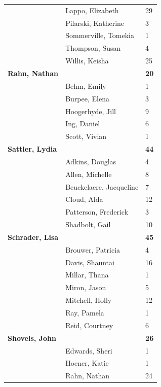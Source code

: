 \documentclass{article}\usepackage[]{graphicx}\usepackage[]{color}
\begin{document}
{\begin{longtable} { >{\raggedright}p{}|p{}p{}}
   & Lappo, Elizabeth & 29 \\ 
   & Pilarski, Katherine & 3 \\ 
   & Sommerville, Tomekia & 1 \\ 
   \rowcolor[gray]{0.90} & Thompson, Susan & 4 \\ 
   \rowcolor[gray]{0.90} & Willis, Keisha & 25 \\ 
   \rowcolor[gray]{0.90}\textbf{Rahn, Nathan} &  & \hspace{2cm}\textbf{20} \\ 
   & Behm, Emily & 1 \\ 
   & Burpee, Elena & 3 \\ 
   & Hoogerhyde, Jill & 9 \\ 
   \rowcolor[gray]{0.90} & Ing, Daniel & 6 \\ 
   \rowcolor[gray]{0.90} & Scott, Vivian & 1 \\ 
   \rowcolor[gray]{0.90}\textbf{Sattler, Lydia} &  & \hspace{2cm}\textbf{44} \\ 
   & Adkins, Douglas & 4 \\ 
   & Allen, Michelle & 8 \\ 
   & Beuckelaere, Jacqueline & 7 \\ 
   \rowcolor[gray]{0.90} & Cloud, Alda & 12 \\ 
   \rowcolor[gray]{0.90} & Patterson, Frederick & 3 \\ 
   \rowcolor[gray]{0.90} & Shadbolt, Gail & 10 \\ 
  \textbf{Schrader, Lisa} &  & \hspace{2cm}\textbf{45} \\ 
   & Brouwer, Patricia & 4 \\ 
   & Davis, Shauntai & 16 \\ 
   \rowcolor[gray]{0.90} & Millar, Thana & 1 \\ 
   \rowcolor[gray]{0.90} & Miron, Jason & 5 \\ 
   \rowcolor[gray]{0.90} & Mitchell, Holly & 12 \\ 
   & Ray, Pamela & 1 \\ 
   & Reid, Courtney & 6 \\ 
  \textbf{Shovels, John} &  & \hspace{2cm}\textbf{26} \\ 
   \rowcolor[gray]{0.90} & Edwards, Sheri & 1 \\ 
   \rowcolor[gray]{0.90} & Hoener, Katie & 1 \\ 
   \rowcolor[gray]{0.90} & Rahn, Nathan & 24 \\ 

\end{longtable}}
\end{document}
